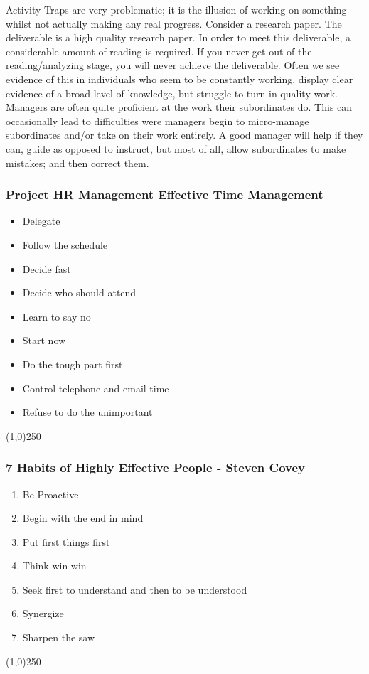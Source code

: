 Activity Traps are very problematic; it is the illusion of working on something whilst not actually making any real progress.  Consider a research paper.  The deliverable is a high quality research paper.  In order to meet this deliverable, a considerable amount of reading is required.  If you never get out of the reading/analyzing stage, you will never achieve the deliverable.  Often we see evidence of this in individuals who seem to be constantly working, display clear evidence of a broad level of knowledge, but struggle to turn in quality work.\\

Managers are often quite proficient at the work their subordinates do.  This can occasionally lead to difficulties were managers begin to micro-manage subordinates and/or take on their work entirely.  A good manager will help if they can, guide as opposed to instruct, but most of all, allow subordinates to make mistakes; and then correct them.  

 
 
\begin{frame}
\frametitle{Project HR Management \hfill Effective Time Management}
\begin{itemize}
	\item Delegate
	\item Follow the schedule
	\item Decide fast
	\item Decide who should attend
	\item Learn to say no
	\item Start now
	\item Do the tough part first
	\item Control telephone and email time
	\item Refuse to do the unimportant
\end{itemize}
\end{frame}\begin{center}\line(1,0){250}\end{center}




\begin{frame}
\frametitle{7 Habits of Highly Effective People - Steven Covey}
\begin{enumerate}
	\item Be Proactive
	\item Begin with the end in mind
	\item Put first things first
	\item Think win-win
	\item Seek first to understand and then to be understood
	\item Synergize
	\item Sharpen the saw
\end{enumerate}
\end{frame}\begin{center}\line(1,0){250}\end{center}
 
